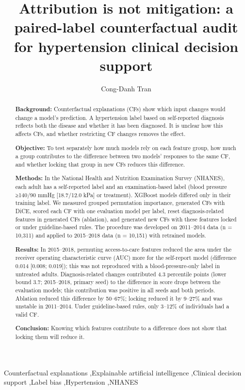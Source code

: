 \documentclass[final,5p,times,twocolumn]{elsarticle}
\begin{document}
\begin{frontmatter}
\title{Attribution is not mitigation: a paired-label counterfactual audit for hypertension clinical decision support}
\author[uit,vnu]{Cong-Danh Tran}
\makeatletter\g@addto@macro{}\makeatother
{}
\begin{abstract}
\textbf{Background:} Counterfactual explanations (CFs) show which input changes would change a model's prediction. A hypertension label based on self-reported diagnosis reflects both the disease and whether it has been diagnosed. It is unclear how this affects CFs, and whether restricting CF changes removes the effect.

\textbf{Objective:} To test separately how much models rely on each feature group, how much a group contributes to the difference between two models' responses to the same CF, and whether locking that group in new CFs reduces this difference.

\textbf{Methods:} In the National Health and Nutrition Examination Survey (NHANES), each adult has a self-reported label and an examination-based label (blood pressure ≥140/90 mmHg [18.7/12.0 kPa] or treatment). XGBoost models differed only in their training label. We measured grouped permutation importance, generated CFs with DiCE, scored each CF with one evaluation model per label, reset diagnosis-related features in generated CFs (ablation), and generated new CFs with these features locked or under guideline-based rules. The procedure was developed on 2011–2014 data (n = 10,311) and applied to 2015–2018 data (n = 10,151) with retrained models.

\textbf{Results:} In 2015–2018, permuting access-to-care features reduced the area under the receiver operating characteristic curve (AUC) more for the self-report model (difference 0.014 [0.008; 0.019]); this was not reproduced with a blood-pressure-only label in untreated adults. Diagnosis-related changes contributed 4.3 percentile points (lower bound 3.7; 2015–2018, primary seed) to the difference in score drops between the evaluation models; this contribution was positive in all seeds and both periods. Ablation reduced this difference by 50–67\%; locking reduced it by 9–27\% and was unstable in 2011–2014. Under guideline-based rules, only 3–12\% of individuals had a valid CF.

\textbf{Conclusion:} Knowing which features contribute to a difference does not show that locking them will reduce it.
\end{abstract}

\begin{keyword}
Counterfactual explanations \sep Explainable artificial intelligence \sep Clinical decision support \sep Label bias \sep Hypertension \sep NHANES
\end{keyword}
\end{frontmatter}
\end{document}
